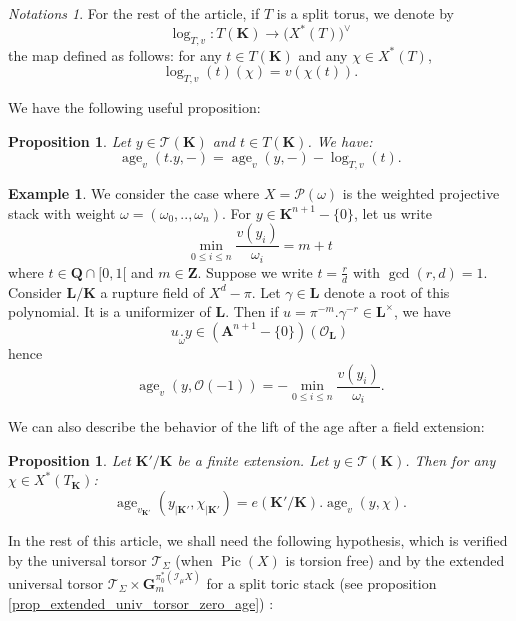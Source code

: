 \documentclass{proc-l}
\newcommand{\Z}{\mathbf{Z}}
\newcommand{\K}{\mathbf{K}}
\newcommand{\Q}{\mathbf{Q}}
\newcommand{\Le}{\mathbf{L}}
\newcommand{\G}{\mathbf{G}}
\DeclareMathOperator{\Pic}{Pic}
\DeclareMathOperator{\age}{age}
\newcommand{\stackT}{\mathcal{T}}
\newcommand{\stackP}{\mathcal{P}}
\newcommand{\affine}{\mathbf{A}}
\newcommand{\sheafI}{\mathcal{I}}
\newcommand{\sheafO}{\mathcal{O}}
\newcommand{\w}{\omega}
\newcommand{\twistsector}{\pi_0^*(\sheafI_{\mu} X)}
\newtheorem{prop}[theorem]{Proposition}
\theoremstyle{definition}
\newtheorem{example}[theorem]{Example}
\theoremstyle{remark}
\newtheorem{Notations}[theorem]{Notations}
\numberwithin{equation}{section}
\begin{document}
\begin{Notations}
For the rest of the article, if $T$ is a split torus, we denote by
\[
\log_{T,v} : T(\K) \longrightarrow \bigl(X^*(T)\bigr)^{\vee}
\]
the map defined as follows: for any $t \in T(\K)$ and any $\chi \in X^*(T)$,
\[
\log_{T,v}(t)(\chi) = v\!\left(\chi(t)\right).
\]
  
\end{Notations}
 We have the following useful proposition:

\begin{prop}\label{prop_age_and_logarithm}
    Let $y \in \stackT(\K)$ and $t \in T(\K)$. We have:
    $$\age_v(t.y,-) = \age_v(y,-) - \log_{T,v}(t) .$$
\end{prop}

\begin{example}\label{example_computation_age_weighted_projective_stack}
    We consider the case where $X = \stackP(\w)$ is the weighted projective stack with weight $\w = (\w_0,..,\w_n)$. For $y \in \K^{n+1}-\{0\}$, let us write $$\min\limits_{0 \leqslant i \leqslant n} \frac{v(y_i)}{\w_i} = m + t $$ where $t \in \Q \cap [0,1[$ and $m \in \Z$. Suppose we write $t = \frac{r}{d}$ with $\gcd(r,d) = 1$. Consider $\Le / \K$ a rupture field of $X^d - \pi$. Let $\gamma \in \Le$ denote a root of this polynomial. It is a uniformizer of $\Le$. Then if $u = \pi^{-m} . \gamma^{-r} \in \Le^{\times}$, we have $$u \underset{\w}{.} y \in \left( \affine^{n+1}-\{0\} \right)(\sheafO_{\Le})$$hence $$ \age_v(y,\sheafO(-1)) = - \min\limits_{0 \leqslant i \leqslant n} \frac{v(y_i)}{\w_i}.$$
    
\end{example}


We can also describe the behavior of the lift of the age after a field extension:

\begin{prop}\label{proposition_age_and_field_extension}
    Let $\K' / \K$ be a finite extension. Let $y \in \stackT(\K)$. Then for any $\chi \in X^*(T_{\K})$:
    $$\age_{v_{\K'}}(y_{|\K'},\chi_{|\K'}) = e(\K' / \K) . \age_v(y,\chi) .$$
\end{prop}


In the rest of this article, we shall need the following hypothesis, which is verified by the universal torsor $\stackT_{\Sigma}$ (when $\Pic(X)$ is torsion free) and by the extended universal torsor $\stackT_{\Sigma} \times \G_m^{\twistsector}$ for a split toric stack (see proposition \ref{prop_extended_univ_torsor_zero_age}) :
\end{document}
